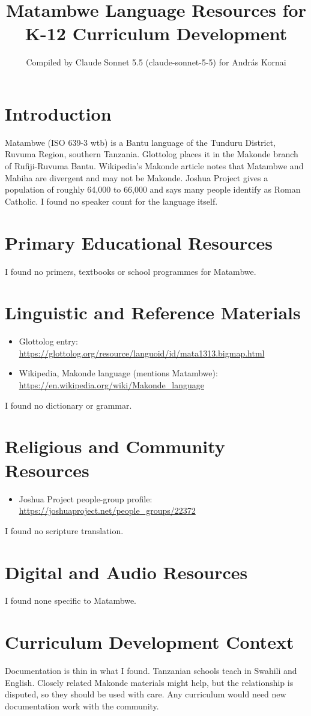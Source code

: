 \documentclass[12pt]{article}
\title{Matambwe Language Resources for K-12 Curriculum Development}
\author{Compiled by Claude Sonnet 5.5 (claude-sonnet-5-5) for Andr\'as Kornai}
\date{}
\begin{document}
\maketitle

\section{Introduction}
Matambwe (ISO 639-3 wtb) is a Bantu language of the Tunduru District, Ruvuma Region, southern Tanzania. Glottolog places it in the Makonde branch of Rufiji-Ruvuma Bantu. Wikipedia's Makonde article notes that Matambwe and Mabiha are divergent and may not be Makonde. Joshua Project gives a population of roughly 64,000 to 66,000 and says many people identify as Roman Catholic. I found no speaker count for the language itself.

\section{Primary Educational Resources}
I found no primers, textbooks or school programmes for Matambwe.

\section{Linguistic and Reference Materials}
\begin{itemize}
\item Glottolog entry: \url{https://glottolog.org/resource/languoid/id/mata1313.bigmap.html}
\item Wikipedia, Makonde language (mentions Matambwe): \url{https://en.wikipedia.org/wiki/Makonde_language}
\end{itemize}
I found no dictionary or grammar.

\section{Religious and Community Resources}
\begin{itemize}
\item Joshua Project people-group profile: \url{https://joshuaproject.net/people_groups/22372}
\end{itemize}
I found no scripture translation.

\section{Digital and Audio Resources}
I found none specific to Matambwe.

\section{Curriculum Development Context}
Documentation is thin in what I found. Tanzanian schools teach in Swahili and English. Closely related Makonde materials might help, but the relationship is disputed, so they should be used with care. Any curriculum would need new documentation work with the community.
\end{document}
